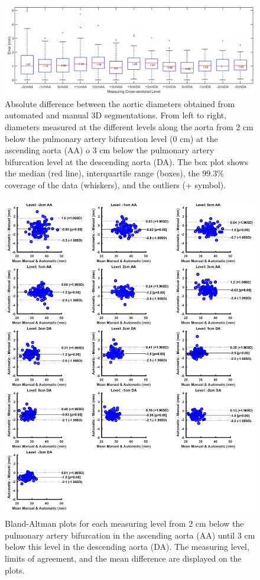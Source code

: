 \begin{figure}
\centering
\includegraphics[width=\textwidth]{Figures/Figure5.jpg}
\caption{Absolute difference between the aortic diameters obtained from automated and manual 3D segmentations. From left to right, diameters measured at the different levels along the aorta from 2 cm below the pulmonary artery bifurcation level (0 cm) at the ascending aorta (AA) o 3 cm below the pulmonary artery bifurcation level at the descending aorta (DA). The box plot shows the median (red line), interquartile range (boxes), the $99.3\%$ coverage of the data (whiskers), and the outliers (+ symbol).}
\label{fig:Boxplot_Difference}
\end{figure}


\begin{figure}
\centering
\includegraphics[width=\textwidth]{Figures/Figure6.jpg}
\caption{Bland-Altman plots for each measuring level from 2 cm below the pulmonary artery bifurcation in the ascending aorta (AA) until 3 cm below this level in the descending aorta (DA). The measuring level, limits of agreement, and the mean difference are displayed on the plots.}
\label{fig:Bland_Altman}
\end{figure}


